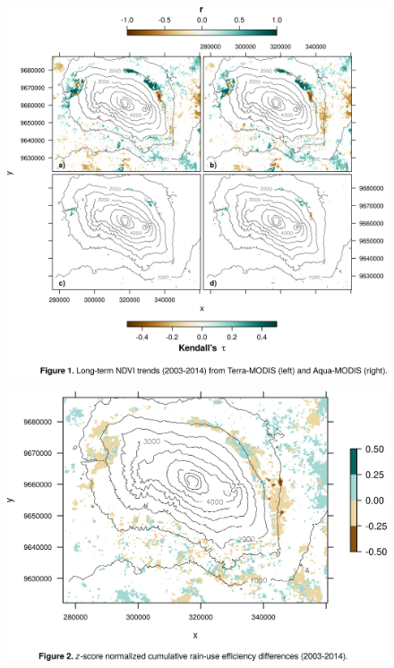 \documentclass{article}
\begin{document}
\begin{figure}[!htbp]
\label{fig_trends}
	\begin{center}
		\includegraphics[width = 1\textwidth]{img/figure_trends.png}
	\end{center}
\end{figure}
 
\begin{figure}[!htbp]
\label{fig_crd}
	\begin{center}
		\includegraphics[width = 1\textwidth]{img/figure_crd.png}
	\end{center}
\end{figure}
 
 
\clearpage  


\end{document}

